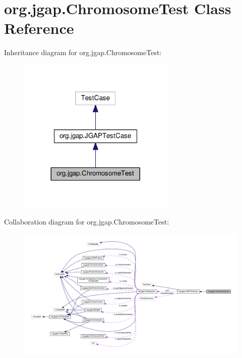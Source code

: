 \hypertarget{classorg_1_1jgap_1_1_chromosome_test}{\section{org.\-jgap.\-Chromosome\-Test Class Reference}
\label{classorg_1_1jgap_1_1_chromosome_test}
}


Inheritance diagram for org.\-jgap.\-Chromosome\-Test\-:
\nopagebreak
\begin{figure}[H]
\begin{center}
\leavevmode
\includegraphics[width=212pt]{classorg_1_1jgap_1_1_chromosome_test__inherit__graph}
\end{center}
\end{figure}


Collaboration diagram for org.\-jgap.\-Chromosome\-Test\-:
\nopagebreak
\begin{figure}[H]
\begin{center}
\leavevmode
\includegraphics[width=350pt]{classorg_1_1jgap_1_1_chromosome_test__coll__graph}
\end{center}
\end{figure}
